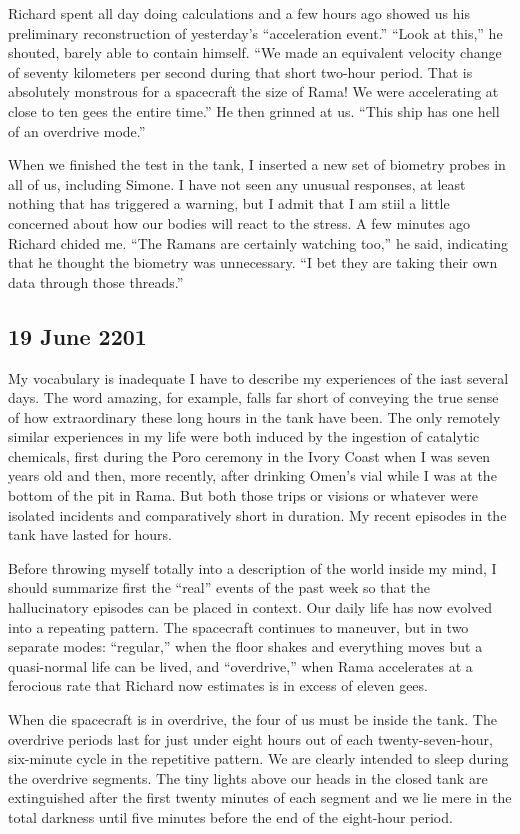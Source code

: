 \documentclass[]{article}
\begin{document}
Richard spent all day doing calculations and a few hours ago showed us his preliminary reconstruction of yesterday’s “acceleration event.” “Look at this,” he shouted, barely able to contain himself. “We made an equivalent velocity change of seventy kilometers per second during that short two-hour period. That is absolutely monstrous for a spacecraft the size of Rama! We were accelerating at close to ten gees the entire time.” He then grinned at us. “This ship has one hell of an overdrive mode.”

When we finished the test in the tank, I inserted a new set of biometry probes in all of us, including Simone. I have not seen any unusual responses, at least nothing that has triggered a warning, but I admit that I am stiil a little concerned about how our bodies will react to the stress. A few minutes ago Richard chided me. “The Ramans are certainly watching too,” he said, indicating that he thought the biometry was unnecessary. “I bet they are taking their own data through those threads.”

\subsection{19 June 2201}

My vocabulary is inadequate I have to describe my experiences of the iast several days. The word amazing, for example, falls far short of conveying the true sense of how extraordinary these long hours in the tank have been. The only remotely similar experiences in my life were both induced by the ingestion of catalytic chemicals, first during the Poro ceremony in the Ivory Coast when I was seven years old and then, more recently, after drinking Omen’s vial while I was at the bottom of the pit in Rama. But both those trips or visions or whatever were isolated incidents and comparatively short in duration. My recent episodes in the tank have lasted for hours.

Before throwing myself totally into a description of the world inside my mind, I should summarize first the “real” events of the past week so that the hallucinatory episodes can be placed in context. Our daily life has now evolved into a repeating pattern. The spacecraft continues to maneuver, but in two separate modes: “regular,” when the floor shakes and everything moves but a quasi-normal life can be lived, and “overdrive,” when Rama accelerates at a ferocious rate that Richard now estimates is in excess of eleven gees.

When die spacecraft is in overdrive, the four of us must be inside the tank. The overdrive periods last for just under eight hours out of each twenty-seven-hour, six-minute cycle in the repetitive pattern. We are clearly intended to sleep during the overdrive segments. The tiny lights above our heads in the closed tank are extinguished after the first twenty minutes of each segment and we lie mere in the total darkness until five minutes before the end of the eight-hour period.
\end{document}
